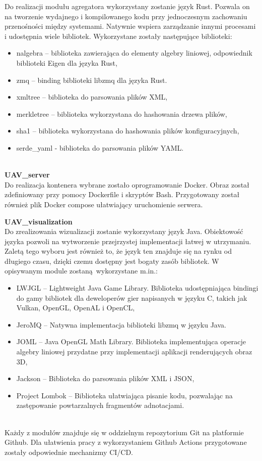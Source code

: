 \documentclass[15pt]{sprawozdanie}
\begin{document}
Do realizacji modułu agregatora wykorzystany zostanie język Rust. Pozwala on na tworzenie wydajnego i kompilowanego kodu przy jednoczesnym zachowaniu przenośności między systemami. Natywnie wspiera zarządzanie innymi procesami i udostępnia wiele bibliotek. Wykorzystane zostały następujące biblioteki:
\begin{itemize}[noitemsep,nolistsep]
	\item nalgebra -- biblioteka zawierająca do elementy algebry liniowej, odpowiednik biblioteki Eigen dla języka Rust,
	\item zmq -- binding biblioteki libzmq dla języka Rust.
	\item xmltree -- biblioteka do parsowania plików XML,
	\item merkletree -- biblioteka wykorzystana do hashowania drzewa plików,
	\item sha1 -- biblioteka wykorzystana do hashowania plików konfiguracyjnych,
	\item serde\_yaml  - biblioteka do parsowania plików YAML.
\end{itemize}
\  \\
\textbf{UAV\_server}\\

Do realizacja kontenera wybrane zostało oprogramowanie Docker. Obraz został zdefiniowany przy pomocy Dockerfile i skryptów Bash. Przygotowany został również plik Docker compose ułatwiający uruchomienie serwera.

\newpage

\textbf{UAV\_visualization}\\

Do zrealizowania wizualizacji zostanie wykorzystany język Java. Obiektowość języka pozwoli na wytworzenie przejrzystej implementacji łatwej w utrzymaniu. Zaletą tego wyboru jest również to, że język ten znajduje się na rynku od długiego czasu, dzięki czemu dostępny jest bogaty zasób bibliotek. W opisywanym module zostaną wykorzystane m.in.:
\begin{itemize}[noitemsep,nolistsep]
	\item LWJGL -- Lightweight Java Game Library. Biblioteka udostępniająca bindingi do gamy bibliotek dla deweloperów gier napisanych w języku C, takich jak Vulkan, OpenGL, OpenAL i OpenCL,
	\item JeroMQ -- Natywna implementacja biblioteki libzmq w języku Java.
	\item JOML -- Java OpenGL Math Library. Biblioteka implementująca operacje algebry liniowej przydatne przy implementacji aplikacji renderujących obraz 3D,
	\item Jackson -- Biblioteka do parsowania plików XML i JSON,
	\item Project Lombok -- Biblioteka ułatwiająca pisanie kodu, pozwalając na zastępowanie powtarzalnych fragmentów adnotacjami.
\end{itemize}
\ \\ 
Każdy z modułów znajduje się w oddzielnym repozytorium Git na platformie Github. Dla ułatwienia pracy z wykorzystaniem Github Actions przygotowane zostały odpowiednie mechanizmy CI/CD.
\end{document}
